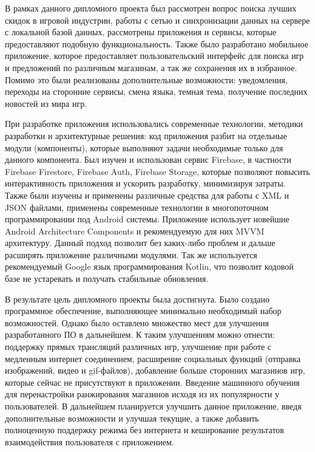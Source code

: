  
В рамках данного дипломного проекта был рассмотрен вопрос поиска лучших скидок в игровой индустрии, работы с сетью и синхронизации данных на сервере с локальной базой данных, рассмотрены приложения и сервисы, которые предоставляют подобную функциональность. Также было разработано мобильное приложение, которое предоставляет пользовательский интерфейс для поиска игр и предложений по различным магазинам, а так же сохранения их в избранное. Помимо это были реализованы дополнительные возможности: уведомления, переходы на сторонние сервисы, смена языка, темная тема, получение последних новостей из мира игр.
 
При разработке приложения использовались современные технологии, методики разработки и архитектурные решения: код приложения разбит на отдельные модули (компоненты), которые выполняют задачи необходимые только для данного компонента. Был изучен и использован сервис Firebase, в частности Firebase Firestore, Firebase Auth, Firebase Storage, которые позволяют повысить интерактивность приложения и ускорить разработку, минимизируя затраты. Также были изучены и применены различные средства для работы с XML и JSON файлами, применены современные технологии в многопоточном программировании под Android системы. Приложение использует новейшие Android Architecture Components и рекомендуемую для них MVVM архитектуру. Данный подход позволит без каких-либо проблем и дальше расширять приложение различными модулями. Так же используется рекомендуемый Google язык программирования Kotlin, что позволит кодовой базе не устаревать и получать стабильные обновления.
 
В результате цель дипломного проекты была достигнута.
Было создано программное обеспечение, выполняющее минимально необходимый набор возможностей.
Однако было оставлено множество мест для улучшения разработанного ПО в дальнейшем. К таким улучшениям можно отнести: поддержку прямых трансляций различных игр, улучшение при работе с медленным интернет соединением, расширение социальных функций (отправка изображений, видео и gif-файлов), добавление больше сторонних магазинов игр, которые сейчас не присутствуют в приложении. Введение машинного обучения для перенастройки ранжирования магазинов исходя из их популярности у пользователей. В дальнейшем планируется улучшить данное приложение, введя дополнительные возможности и улучшая текущие, а также добавить полноценную поддержку режима без интернета и кеширование результатов взаимодействия пользователя с приложением.
